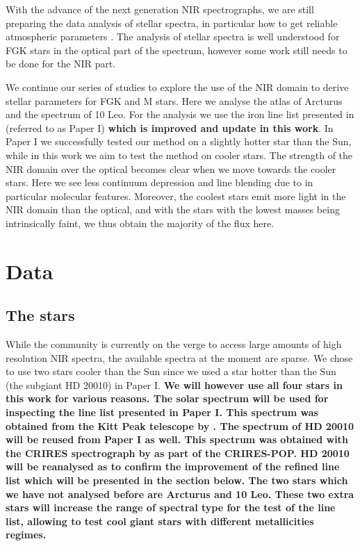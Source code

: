 \documentclass{aa}
\begin{document}
With the advance of the next generation NIR spectrographs, we are still
preparing the data analysis of stellar spectra, in particular how to get
reliable atmospheric parameters \citep[see e.g.][]{Onehag2012,Lindgren2016,Andreasen2016}.
The analysis of stellar spectra is well understood for FGK stars in the optical
part of the spectrum, however some work still needs to be done for the NIR part.

We continue our series of studies to explore the use of the NIR domain to derive
stellar parameters for FGK and M stars. Here we analyse the atlas of Arcturus
and the spectrum of 10 Leo. For the analysis we use the iron line list presented
in \citet{Andreasen2016} (referred to as Paper I) {\bf which is improved and
update in this work}. In Paper I we successfully tested our method on a slightly
hotter star than the Sun, while in this work we aim to test the method on cooler
stars. The strength of the NIR domain over the optical becomes clear when we
move towards the cooler stars. Here we see less continuum depression and line
blending due to in particular molecular features. Moreover, the coolest stars
emit more light in the NIR domain than the optical, and with the stars with the
lowest masses being intrinsically faint, we thus obtain the majority of the flux
here.



\section{Data}
\label{sec:data}

\subsection{The stars}

While the community is currently on the verge to access large amounts of high
resolution NIR spectra, the available spectra at the moment are sparse. We chose
to use two stars cooler than the Sun since we used a star hotter than the Sun
(the subgiant HD 20010) in Paper I. {\bf We will however use all four stars in
this work for various reasons. The solar spectrum will be used for inspecting
the line list presented in Paper I. This spectrum was obtained from the Kitt
Peak telescope by \citet{Hinkle1995}. The spectrum of HD 20010 will be reused
from Paper I as well. This spectrum was obtained with the CRIRES spectrograph by
\citet{Lebzelter2012} as part of the CRIRES-POP. HD 20010 will be reanalysed as
to confirm the improvement of the refined line list which will be presented in
the section below. The two stars which we have not analysed before are Arcturus
and 10 Leo. These two extra stars will increase the range of spectral type for
the test of the line list, allowing to test cool giant stars with different
metallicities regimes.}
\end{document}
